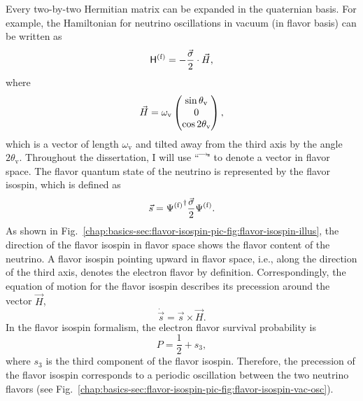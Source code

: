 Every two-by-two Hermitian matrix can be expanded in the quaternian basis. For example, the Hamiltonian for neutrino oscillations in vacuum (in flavor basis) can be written as
\begin{equation}
\mathsf H^{(\mathrm f)} = - \frac{\vec{\sigma} }{2}\cdot {\vec{H}},
\end{equation}
where
\begin{align*}
{\vec H} =  \omega_\mathrm v\begin{pmatrix}
 \sin \theta_\mathrm v\\
0\\
\cos 2\theta_{\mathrm v}
\end{pmatrix},
\end{align*}
which is a vector of length $\omega_{\mathrm v}$ and tilted away from the third axis by the angle $2\theta_{\mathrm v}$.
Throughout the dissertation, I will use ``$\vec{\phantom{x~}}$" to denote a vector in flavor space.
The flavor quantum state of the neutrino is represented by the flavor isospin, which is defined as
\begin{equation}
    \vec s = {\Psi^{(\mathrm f)}}^{\dagger} \frac{\vec{\sigma} }{2} \Psi^{(\mathrm f)}.
\end{equation}
As shown in Fig.~\ref{chap:basics-sec:flavor-isospin-pic-fig:flavor-isospin-illus}, the direction of the flavor isospin in flavor space shows the flavor content of the neutrino. A flavor isospin pointing upward in flavor space, i.e., along the direction of the third axis, denotes the electron flavor by definition.
Correspondingly, the equation of motion for the flavor isospin describes its precession around the vector $\vec{H}$,
\begin{equation}
\dot{\vec{s}} = {\vec{s}} \times \vec{H}.
\label{chap:basics-sec:flavor-isospin-pic-eqn:eom-precession}
\end{equation}
In the flavor isospin formalism, the electron flavor survival probability is
\begin{equation*}
P = \frac{1}{2} + s_3,
\label{chap:basics-sec:flavor-isospin-pic-eqn:probability-flavor}
\end{equation*}
where $s_3$ is the third component of the flavor isospin.
Therefore, the precession of the flavor isospin corresponds to a periodic oscillation between the two neutrino flavors (see Fig.~\ref{chap:basics-sec:flavor-isospin-pic-fig:flavor-isospin-vac-osc}).
